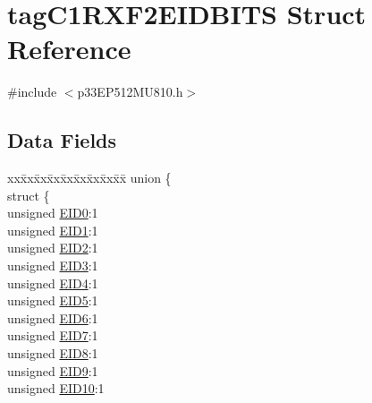 \hypertarget{structtag_c1_r_x_f2_e_i_d_b_i_t_s}{}\section{tag\+C1\+R\+X\+F2\+E\+I\+D\+B\+I\+TS Struct Reference}
\label{structtag_c1_r_x_f2_e_i_d_b_i_t_s}


{\ttfamily \#include $<$p33\+E\+P512\+M\+U810.\+h$>$}

\subsection*{Data Fields}
\begin{DoxyCompactItemize}
\item 
\begin{tabbing}
xx\=xx\=xx\=xx\=xx\=xx\=xx\=xx\=xx\=\kill
union \{\\
\>struct \{\\
\>\>unsigned \hyperlink{structtag_c1_r_x_f2_e_i_d_b_i_t_s_a9da8b7b30247e4f9cd8cc056549aa9fd}{EID0}:1\\
\>\>unsigned \hyperlink{structtag_c1_r_x_f2_e_i_d_b_i_t_s_afd6c139491d147c1262f3d051c6691e9}{EID1}:1\\
\>\>unsigned \hyperlink{structtag_c1_r_x_f2_e_i_d_b_i_t_s_a36ec62d8d3c5acd5d15e6691dc099a94}{EID2}:1\\
\>\>unsigned \hyperlink{structtag_c1_r_x_f2_e_i_d_b_i_t_s_ab895f7d0ac289a0383b607cbc62eebe2}{EID3}:1\\
\>\>unsigned \hyperlink{structtag_c1_r_x_f2_e_i_d_b_i_t_s_a136d5a709d6618d40acceccb43036656}{EID4}:1\\
\>\>unsigned \hyperlink{structtag_c1_r_x_f2_e_i_d_b_i_t_s_a8dffb2d86a6c184df505ae7c71a58710}{EID5}:1\\
\>\>unsigned \hyperlink{structtag_c1_r_x_f2_e_i_d_b_i_t_s_af8a8574102515d8f1a4b7fd1685d0532}{EID6}:1\\
\>\>unsigned \hyperlink{structtag_c1_r_x_f2_e_i_d_b_i_t_s_a84c3262e67f8d5fd387ac10bde6fa9b1}{EID7}:1\\
\>\>unsigned \hyperlink{structtag_c1_r_x_f2_e_i_d_b_i_t_s_acca25e0b7d86eb499d01f85222baea87}{EID8}:1\\
\>\>unsigned \hyperlink{structtag_c1_r_x_f2_e_i_d_b_i_t_s_ac6748f73d4ada8538b06548be4f396c2}{EID9}:1\\
\>\>unsigned \hyperlink{structtag_c1_r_x_f2_e_i_d_b_i_t_s_a9cea8e77ecbb72bd3b08102412793725}{EID10}:1\\

\end{tabbing}
\end{DoxyCompactItemize}
